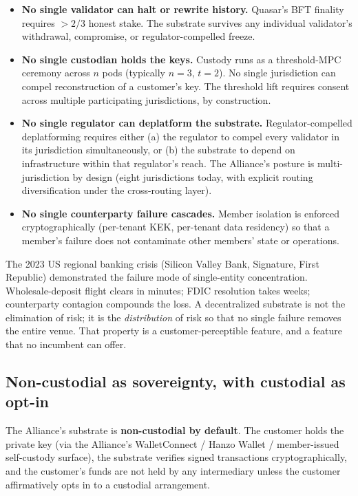 \begin{itemize}[leftmargin=2em,itemsep=0.1em]
\item \textbf{No single validator can halt or rewrite history.}
Quasar's BFT finality requires $>2/3$ honest stake. The substrate
survives any individual validator's withdrawal, compromise, or
regulator-compelled freeze.
\item \textbf{No single custodian holds the keys.} Custody runs as a
threshold-MPC ceremony across $n$ pods (typically $n=3$, $t=2$). No
single jurisdiction can compel reconstruction of a customer's key.
The threshold lift requires consent across multiple participating
jurisdictions, by construction.
\item \textbf{No single regulator can deplatform the substrate.}
Regulator-compelled deplatforming requires either (a) the regulator
to compel every validator in its jurisdiction simultaneously, or (b)
the substrate to depend on infrastructure within that regulator's
reach. The Alliance's posture is multi-jurisdiction by design (eight
jurisdictions today, with explicit routing diversification under
the cross-routing layer).
\item \textbf{No single counterparty failure cascades.} Member
isolation is enforced cryptographically (per-tenant KEK, per-tenant
data residency) so that a member's failure does not contaminate
other members' state or operations.
\end{itemize}

The 2023 US regional banking crisis (Silicon Valley Bank, Signature,
First Republic) demonstrated the failure mode of single-entity
concentration. Wholesale-deposit flight clears in minutes; FDIC
resolution takes weeks; counterparty contagion compounds the loss. A
decentralized substrate is not the elimination of risk; it is the
\emph{distribution} of risk so that no single failure removes the
entire venue. That property is a customer-perceptible feature, and a
feature that no incumbent can offer.

\subsection{Non-custodial as sovereignty, with custodial as opt-in}

The Alliance's substrate is \textbf{non-custodial by default}. The
customer holds the private key (via the Alliance's WalletConnect /
Hanzo Wallet / member-issued self-custody surface), the substrate
verifies signed transactions cryptographically, and the customer's
funds are not held by any intermediary unless the customer affirmatively
opts in to a custodial arrangement.

